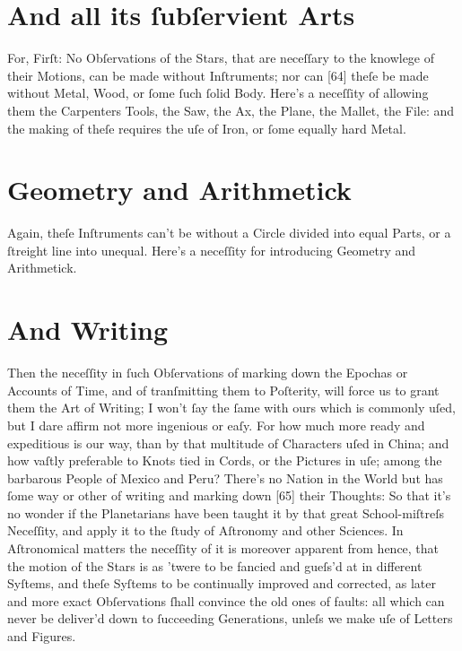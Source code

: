 \documentclass[letterpaper]{book}
\begin{document}
\section{And all its ſubſervient Arts}

For, Firſt: No Obſervations of the Stars, that are neceſſary to the knowlege
of their Motions, can be made without Inſtruments; nor can [64] theſe be
made without Metal, Wood, or ſome ſuch ſolid Body. Here's a neceſſity of
allowing them the Carpenters Tools, the Saw, the Ax, the Plane, the Mallet,
the File: and the making of theſe requires the uſe of Iron, or ſome equally
hard Metal.


\section{Geometry and Arithmetick}

Again, theſe Inſtruments can't be without a Circle divided into equal Parts,
or a ſtreight line into unequal. Here's a neceſſity for introducing Geometry
and Arithmetick.



\section{And Writing}

Then the neceſſity in ſuch Obſervations of marking down the Epochas or
Accounts of Time, and of tranſmitting them to Poſterity, will force us to
grant them the Art of Writing; I won't ſay the ſame with ours which is
commonly uſed, but I dare affirm not more ingenious or eaſy. For how
much more ready and expeditious is our way, than by that multitude of
Characters uſed in China; and how vaſtly preferable to Knots tied in Cords,
or the Pictures in uſe; among the barbarous People of Mexico and Peru?
There's no Nation in the World but has ſome way or other of writing and
marking down [65] their Thoughts: So that it's no wonder if the Planetarians
have been taught it by that great School-miſtreſs Neceſſity, and apply it to
the ſtudy of Aſtronomy and other Sciences. In Aſtronomical matters the
neceſſity of it is moreover apparent from hence, that the motion of the
Stars is as 'twere to be fancied and gueſs'd at in different Syſtems, and
theſe Syſtems to be continually improved and corrected, as later and more
exact Obſervations ſhall convince the old ones of faults: all which can never
be deliver'd down to ſucceeding Generations, unleſs we make uſe of Letters
and Figures.
\end{document}
